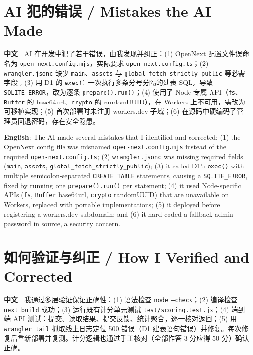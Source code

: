 \documentclass[11pt,a4paper]{ctexart}
\begin{document}
\section{AI 犯的错误 / Mistakes the AI Made}

\noindent\textbf{中文}：AI 在开发中犯了若干错误，由我发现并纠正：(1) OpenNext 配置文件误命名为 \texttt{open-next.config.mjs}，实际要求 \texttt{open-next.config.ts}；(2) \texttt{wrangler.jsonc} 缺少 \texttt{main}、\texttt{assets} 与 \texttt{global\_fetch\_strictly\_public} 等必需字段；(3) 用 D1 的 \texttt{exec()} 一次执行多条分号分隔的建表 SQL，导致 \texttt{SQLITE\_ERROR}，改为逐条 \texttt{prepare().run()}；(4) 使用了 Node 专属 API（\texttt{fs}、\texttt{Buffer} 的 base64url、\texttt{crypto} 的 randomUUID），在 Workers 上不可用，需改为可移植实现；(5) 首次部署时未注册 workers.dev 子域；(6) 在源码中硬编码了管理员回退密码，存在安全隐患。

\medskip

\noindent\textbf{English}: The AI made several mistakes that I identified and corrected: (1) the OpenNext config file was misnamed \texttt{open-next.config.mjs} instead of the required \texttt{open-next.config.ts}; (2) \texttt{wrangler.jsonc} was missing required fields (\texttt{main}, \texttt{assets}, \texttt{global\_fetch\_strictly\_public}); (3) it called D1's \texttt{exec()} with multiple semicolon-separated \texttt{CREATE TABLE} statements, causing a \texttt{SQLITE\_ERROR}, fixed by running one \texttt{prepare().run()} per statement; (4) it used Node-specific APIs (\texttt{fs}, \texttt{Buffer} base64url, \texttt{crypto} randomUUID) that are unavailable on Workers, replaced with portable implementations; (5) it deployed before registering a workers.dev subdomain; and (6) it hard-coded a fallback admin password in source, a security concern.

\section{如何验证与纠正 / How I Verified and Corrected}

\noindent\textbf{中文}：我通过多层验证保证正确性：(1) 语法检查 \texttt{node --check}；(2) 编译检查 \texttt{next build} 成功；(3) 运行既有计分单元测试 \texttt{test/scoring.test.js}；(4) 端到端 API 测试：提交、读取结果、提交反馈、统计聚合，逐一核对返回；(5) 用 \texttt{wrangler tail} 抓取线上日志定位 500 错误（D1 建表语句错误）并修复。每次修复后重新部署并复测。计分逻辑也通过手工核对（全部作答 3 分应得 50 分）确认正确。

\medskip
\end{document}
